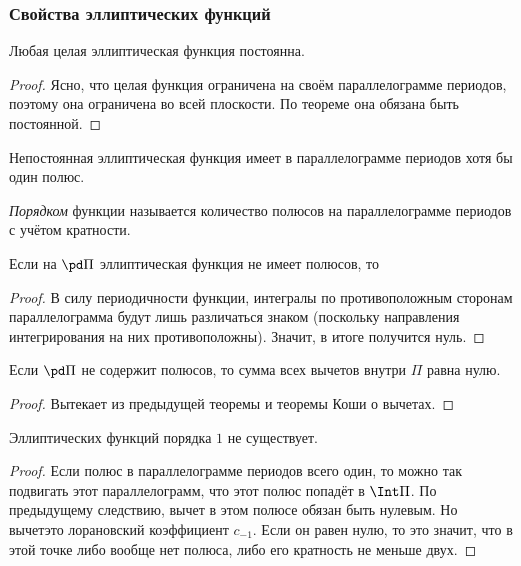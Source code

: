 \documentclass[a4paper]{article}
\begin{document}
\subsubsection{Свойства эллиптических функций}

\begin{theorem}
Любая целая эллиптическая функция постоянна.
\end{theorem}
\begin{proof}
Ясно, что целая функция ограничена на своём параллелограмме периодов, поэтому она ограничена
во всей плоскости. По теореме она обязана быть постоянной.
\end{proof}

\begin{imp}
Непостоянная эллиптическая функция имеет в параллелограмме периодов хотя бы один полюс.
\end{imp}

\begin{df}
\emph{Порядком} функции называется количество полюсов на параллелограмме периодов с учётом кратности.
\end{df}

\begin{theorem}
Если на $\pd \Pi$ эллиптическая функция не имеет полюсов, то
\end{theorem}
\begin{proof}
В силу периодичности функции, интегралы по противоположным сторонам параллелограмма
будут лишь различаться знаком (поскольку направления интегрирования на них противоположны).
Значит, в итоге получится нуль.
\end{proof}

\begin{imp}
Если $\pd \Pi$ не содержит полюсов, то сумма всех вычетов внутри $\Pi$ равна нулю.
\end{imp}
\begin{proof}
Вытекает из предыдущей теоремы и теоремы Коши о вычетах.
\end{proof}

\begin{imp}
Эллиптических функций порядка $1$ не существует.
\end{imp}
\begin{proof}
Если полюс в параллелограмме периодов всего один, то можно так подвигать этот параллелограмм,
что этот полюс попадёт в $\Int \Pi$. По предыдущему следствию, вычет в этом полюсе обязан быть нулевым.
Но вычет\т это лорановский коэффициент $c_{-1}$. Если он равен нулю, то это значит,
что в этой точке либо вообще нет полюса, либо его кратность не меньше двух.
\end{proof}
\end{document}

